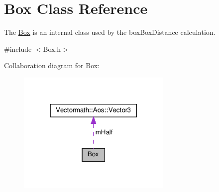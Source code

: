 \hypertarget{classBox}{}\section{Box Class Reference}
\label{classBox}


The \hyperlink{classBox}{Box} is an internal class used by the box\+Box\+Distance calculation.  




{\ttfamily \#include $<$Box.\+h$>$}



Collaboration diagram for Box\+:
\nopagebreak
\begin{figure}[H]
\begin{center}
\leavevmode
\includegraphics[width=210pt]{classBox__coll__graph}
\end{center}
\end{figure}
